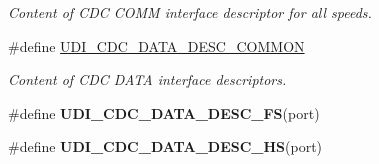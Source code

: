 \begin{DoxyCompactItemize}
\begin{DoxyCompactList}\small\item\em Content of C\-D\-C C\-O\-M\-M interface descriptor for all speeds. \end{DoxyCompactList}\item 
\#define \hyperlink{group__udi__cdc__group__desc_ga8633fe8f07308643879792e822393621}{U\-D\-I\-\_\-\-C\-D\-C\-\_\-\-D\-A\-T\-A\-\_\-\-D\-E\-S\-C\-\_\-\-C\-O\-M\-M\-O\-N}
\begin{DoxyCompactList}\small\item\em Content of C\-D\-C D\-A\-T\-A interface descriptors. \end{DoxyCompactList}\item 
\#define {\bfseries U\-D\-I\-\_\-\-C\-D\-C\-\_\-\-D\-A\-T\-A\-\_\-\-D\-E\-S\-C\-\_\-\-F\-S}(port)
\item 
\#define {\bfseries U\-D\-I\-\_\-\-C\-D\-C\-\_\-\-D\-A\-T\-A\-\_\-\-D\-E\-S\-C\-\_\-\-H\-S}(port)
\end{DoxyCompactItemize}
